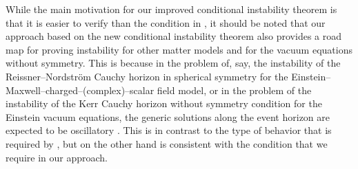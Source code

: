 \documentclass[10pt, reqno]{amsart}
\theoremstyle{definition}
\theoremstyle{remark}
\numberwithin{equation}{section}
\newcommand{\0}{\emptyset}
\begin{document}
While the main motivation for our improved conditional instability theorem is that it is easier to verify than the condition in \cite{D2}, it should be noted that our approach based on the new conditional instability theorem also provides a road map for proving instability for other matter models and for the vacuum equations without symmetry. This is because in the problem of, say, the instability of the Reissner--Nordstr\"om Cauchy horizon in spherical symmetry for the Einstein--Maxwell--charged--(complex)--scalar field model, or in the problem of the instability of the Kerr Cauchy horizon without symmetry condition for the Einstein vacuum equations, the generic solutions along the event horizon are expected to be oscillatory \cite{HodPiran1, HodPiran2, HodPiran3, Barack, OriSpin}. This is in contrast to the type of behavior that is required by \cite{D2}, but on the other hand is consistent with the condition that we require in our approach.
\end{document}
